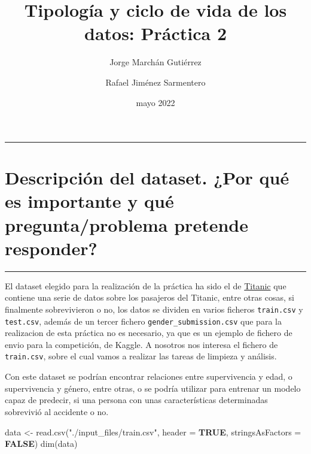 \documentclass[
]{article}
\title{Tipología y ciclo de vida de los datos: Práctica 2}
\author{Jorge Marchán Gutiérrez \and Rafael Jiménez Sarmentero}
\date{mayo 2022}
\newenvironment{Shaded}{\begin{snugshade}}{\end{snugshade}}
\newcommand{\AttributeTok}[1]{\textcolor[rgb]{0.80,0.80,0.80}{#1}}
\newcommand{\ConstantTok}[1]{\textcolor[rgb]{0.86,0.64,0.64}{\textbf{#1}}}
\newcommand{\FunctionTok}[1]{\textcolor[rgb]{0.94,0.94,0.56}{#1}}
\newcommand{\NormalTok}[1]{\textcolor[rgb]{0.80,0.80,0.80}{#1}}
\newcommand{\OtherTok}[1]{\textcolor[rgb]{0.94,0.94,0.56}{#1}}
\newcommand{\StringTok}[1]{\textcolor[rgb]{0.80,0.58,0.58}{#1}}
\begin{document}
\maketitle

{
\setcounter{tocdepth}{2}
\tableofcontents
}
\begin{center}\rule{0.5\linewidth}{0.5pt}\end{center}

\hypertarget{descripciuxf3n-del-dataset.-por-quuxe9-es-importante-y-quuxe9-preguntaproblema-pretende-responder}{%
\section{Descripción del dataset. ¿Por qué es importante y qué
pregunta/problema pretende
responder?}\label{descripciuxf3n-del-dataset.-por-quuxe9-es-importante-y-quuxe9-preguntaproblema-pretende-responder}}

\begin{center}\rule{0.5\linewidth}{0.5pt}\end{center}

El dataset elegido para la realización de la práctica ha sido el de
\href{https://www.kaggle.com/competitions/titanic/overview}{Titanic} que
contiene una serie de datos sobre los pasajeros del Titanic, entre otras
cosas, si finalmente sobrevivieron o no, los datos se dividen en varios
ficheros \texttt{train.csv} y \texttt{test.csv}, además de un tercer
fichero \texttt{gender\_submission.csv} que para la realizacion de esta
práctica no es necesario, ya que es un ejemplo de fichero de envio para
la competición, de Kaggle. A nosotros nos interesa el fichero de
\texttt{train.csv}, sobre el cual vamos a realizar las tareas de
limpieza y análisis.

Con este dataset se podrían encontrar relaciones entre supervivencia y
edad, o supervivencia y género, entre otras, o se podría utilizar para
entrenar un modelo capaz de predecir, si una persona con unas
características determinadas sobrevivió al accidente o no.

\begin{Shaded}
\begin{Highlighting}[]
\NormalTok{data }\OtherTok{\textless{}{-}} \FunctionTok{read.csv}\NormalTok{(}\StringTok{"./input\_files/train.csv"}\NormalTok{, }\AttributeTok{header =} \ConstantTok{TRUE}\NormalTok{, }\AttributeTok{stringsAsFactors =} \ConstantTok{FALSE}\NormalTok{)}
\FunctionTok{dim}\NormalTok{(data)}
\end{Highlighting}
\end{Shaded}
\end{document}
